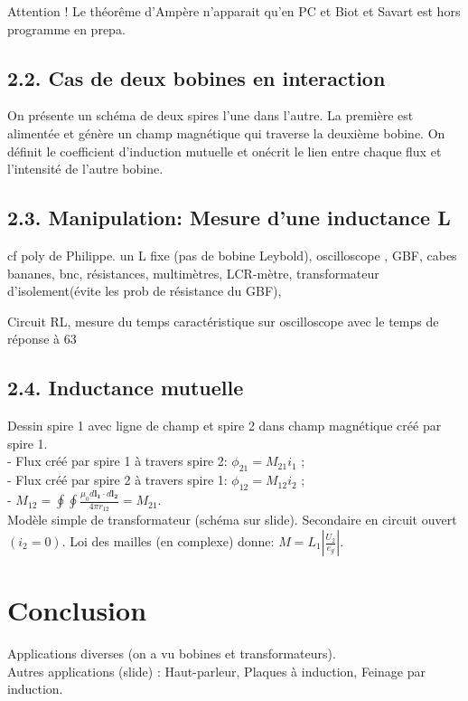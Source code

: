 \documentclass[french, a4paper, 10pt, twocolumn, landscape]{article}
\begin{document}
Attention ! Le théorême d'Ampère n'apparait qu'en PC et Biot et Savart est hors programme en prepa.

\subsection*{2.2. Cas de deux bobines en interaction}
On présente un schéma de deux spires l'une dans l'autre. La première est alimentée et génère un champ magnétique qui traverse la deuxième bobine. On définit le coefficient d'induction mutuelle et onécrit le lien entre chaque flux et l'intensité de l'autre bobine.

\subsection*{2.3. Manipulation: Mesure d'une inductance L}

cf poly de Philippe. un L fixe (pas de bobine Leybold), oscilloscope , GBF, cabes bananes, bnc, résistances, multimètres, LCR-mètre, transformateur d'isolement(évite les prob de résistance du GBF),

Circuit RL, mesure du temps caractéristique sur oscilloscope avec le temps de réponse à 63%

\subsection*{2.4. Inductance mutuelle}
Dessin spire 1 avec ligne de champ et spire 2 dans champ magnétique créé par spire 1. \\
- Flux créé par spire 1 à travers spire 2: $\phi_{21} = M_{21} i_1$ ; \\
- Flux créé par spire 2 à travers spire 1: $\phi_{12} = M_{12} i_2$ ; \\
- $M_{12} = \oint \oint \frac{\mu_0 d \mathbf{l_1} \cdot d \mathbf{l_2}}{4 \pi r_{12}} = M_{21}$. \\
 Modèle simple de transformateur (schéma sur slide). Secondaire en circuit ouvert $(i_2 = 0)$. Loi des mailles (en complexe) donne: $ M = L_1 \left| \frac{U_2}{e_g} \right|$. 
 
\section*{Conclusion} 
Applications diverses (on a vu bobines et transformateurs). \\
Autres applications (slide) : Haut-parleur, Plaques à induction, Feinage par induction.
\end{document}
